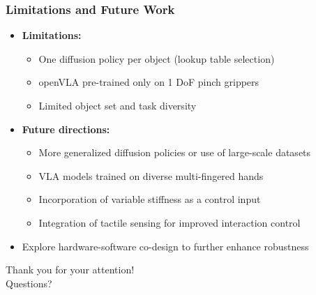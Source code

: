 \documentclass{beamer}
\begin{document}
\begin{frame}
  \frametitle{Limitations and Future Work}
  \small
  \begin{itemize}
    \item \textbf{Limitations:}
      \begin{itemize}
        \item One diffusion policy per object (lookup table selection)
        \item openVLA pre-trained only on 1 DoF pinch grippers
        \item Limited object set and task diversity
      \end{itemize}
    \item \textbf{Future directions:}
      \begin{itemize}
        \item More generalized diffusion policies or use of large-scale datasets
        \item VLA models trained on diverse multi-fingered hands
        \item Incorporation of variable stiffness as a control input
        \item Integration of tactile sensing for improved interaction control
      \end{itemize}
    \item Explore hardware-software co-design to further enhance robustness
  \end{itemize}
\end{frame}

\begin{frame}
  \centering
  \vfill
  \Large Thank you for your attention!\\[0.5cm]
  \normalsize Questions?
  \vfill
\end{frame}

\end{document}
